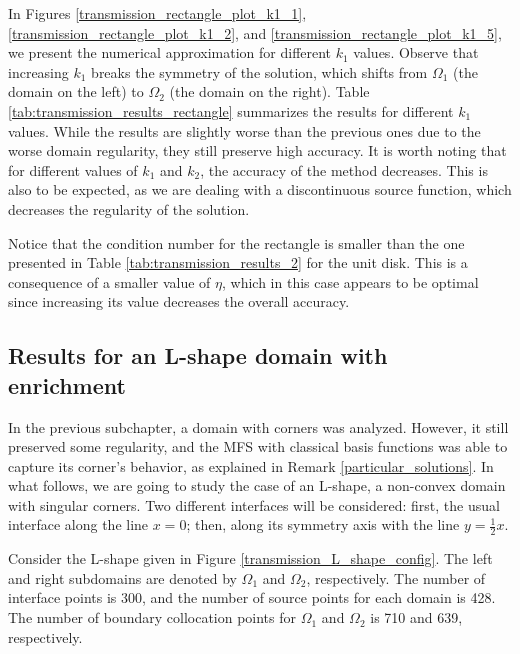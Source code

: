In Figures \ref{transmission_rectangle_plot_k1_1}, \ref{transmission_rectangle_plot_k1_2}, and \ref{transmission_rectangle_plot_k1_5}, we present the numerical approximation for different \(k_1\) values. Observe that increasing \(k_1\) breaks the symmetry of the solution, which shifts from \(\Omega_1\) (the domain on the left) to \(\Omega_2\) (the domain on the right). Table \ref{tab:transmission_results_rectangle} summarizes the results for different \(k_1\) values. While the results are slightly worse than the previous ones due to the worse domain regularity, they still preserve high accuracy. It is worth noting that for different values of \(k_1\) and \(k_2\), the accuracy of the method decreases. This is also to be expected, as we are dealing with a discontinuous source function, which decreases the regularity of the solution.

Notice that the condition number for the rectangle is smaller than the one presented in Table \ref{tab:transmission_results_2} for the unit disk. This is a consequence of a smaller value of \(\eta\), which in this case appears to be optimal since increasing its value decreases the overall accuracy.

\subsection{Results for an L-shape domain with enrichment}

In the previous subchapter, a domain with corners was analyzed. However, it still preserved some regularity, and the \ac{MFS} with classical basis functions was able to capture its corner's behavior, as explained in Remark \ref{particular_solutions}. In what follows, we are going to study the case of an L-shape, a non-convex domain with singular corners. Two different interfaces will be considered: first, the usual interface along the line \(x=0\); then, along its symmetry axis with the line \(y=\frac{1}{2}x\).

Consider the L-shape given in Figure \ref{transmission_L_shape_config}. The left and right subdomains are denoted by \(\Omega_1\) and \(\Omega_2\), respectively. The number of interface points is 300, and the number of source points for each domain is 428. The number of boundary collocation points for \(\Omega_1\) and \(\Omega_2\) is 710 and 639, respectively.

